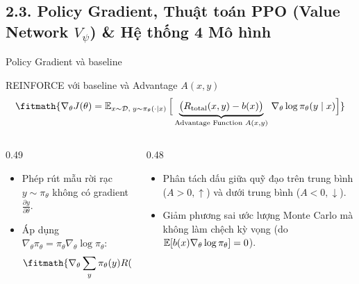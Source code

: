 \subsection{2.3. Policy Gradient, Thuật toán PPO (Value Network \texorpdfstring{$V_\psi$}{V\textunderscore ψ}) \& Hệ thống 4 Mô hình}

\begin{frame}{Policy Gradient và baseline}
  \begin{block}{REINFORCE với baseline và Advantage $A(x, y)$}
    \[
      \fitmath{%
      \nabla_\theta J(\theta) = \E_{x \sim \mathcal{D},\; y \sim \pi_\theta(\cdot \mid x)} \Big[ \underbrace{\big(R_{\text{total}}(x, y) - b(x)\big)}_{\text{Advantage Function } A(x, y)} \, \nabla_\theta \log \pi_\theta(y \mid x) \Big]
      }
    \]
  \end{block}

  \begin{columns}[T,onlytextwidth]
    \begin{column}{0.49\textwidth}
      \small
      \begin{itemize}\setlength{\itemsep}{4pt}
        \item Phép rút mẫu rời rạc $y \sim \pi_\theta$ không có gradient $\frac{\partial y}{\partial \theta}$.
        \item Áp dụng $\nabla_\theta \pi_\theta = \pi_\theta \nabla_\theta \log \pi_\theta$:
          \[
            \fitmath{%
            \nabla_\theta \sum_y \pi_\theta(y) R(y) = \E_{y \sim \pi_\theta}\big[R(y)\nabla_\theta \log \pi_\theta(y)\big]
            }
          \]
      \end{itemize}
    \end{column}
    \begin{column}{0.48\textwidth}
      \small
      \begin{itemize}\setlength{\itemsep}{4pt}
        \item Phân tách dấu giữa quỹ đạo trên trung bình ($A > 0, \uparrow$) và dưới trung bình ($A < 0, \downarrow$).
        \item Giảm phương sai ước lượng Monte Carlo mà không làm chệch kỳ vọng (do $\operatorname{\mathbb{E}}[b(x)\nabla_\theta \log \pi_\theta] = 0$).
      \end{itemize}
    \end{column}
  \end{columns}
  \par\vspace{0pt}
\end{frame}

